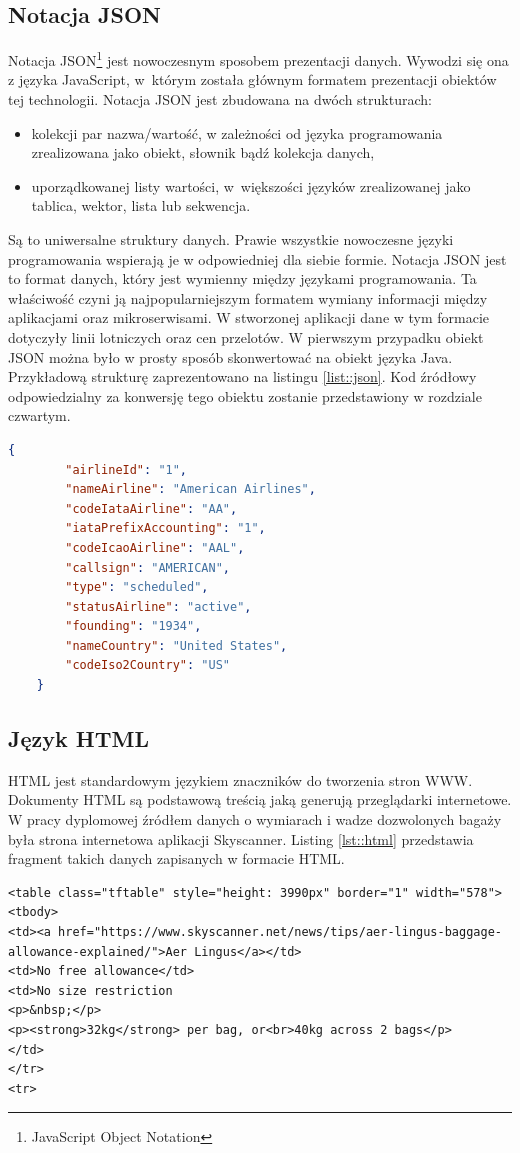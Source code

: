 \documentclass[12pt, twoside]{report}
\begin{document}
\subsection{Notacja JSON}
Notacja JSON\footnote{JavaScript Object Notation} jest nowoczesnym sposobem prezentacji danych. Wywodzi się ona z języka JavaScript, w~którym została głównym formatem prezentacji obiektów tej technologii. Notacja JSON jest zbudowana na dwóch strukturach:
\begin{itemize}[noitemsep,topsep=0pt]
\item kolekcji par nazwa/wartość, w zależności od języka programowania zrealizowana jako obiekt, słownik bądź kolekcja danych,
\item uporządkowanej listy wartości, w~większości języków zrealizowanej jako tablica, wektor, lista lub sekwencja.
\end{itemize}
Są to uniwersalne struktury danych. Prawie wszystkie nowoczesne języki programowania wspierają je w odpowiedniej dla siebie formie. Notacja JSON jest to format danych, który jest wymienny między językami programowania. Ta właściwość czyni ją najpopularniejszym formatem wymiany informacji między aplikacjami oraz mikroserwisami\cite{json}. W stworzonej aplikacji dane w tym formacie dotyczyły linii lotniczych oraz cen przelotów. W pierwszym przypadku obiekt JSON można było w prosty sposób skonwertować na obiekt języka Java. Przykładową strukturę zaprezentowano na listingu \ref{list::json}.
Kod źródłowy odpowiedzialny za konwersję tego obiektu zostanie przedstawiony w rozdziale czwartym.
\begin{lstlisting}[language=JSON, caption= Przykładowy obiekt w notacji JSON, label=list::json]
    {
        "airlineId": "1",
        "nameAirline": "American Airlines",
        "codeIataAirline": "AA",
        "iataPrefixAccounting": "1",
        "codeIcaoAirline": "AAL",
        "callsign": "AMERICAN",
        "type": "scheduled",
        "statusAirline": "active",
        "founding": "1934",
        "nameCountry": "United States",
        "codeIso2Country": "US"
    }
\end{lstlisting}

\subsection{Język HTML}
HTML jest standardowym językiem znaczników do tworzenia stron WWW. Dokumenty HTML są podstawową treścią jaką generują przeglądarki internetowe. W pracy dyplomowej źródłem danych o wymiarach i wadze dozwolonych bagaży była strona internetowa aplikacji Skyscanner\cite{html}. Listing \ref{lst::html} przedstawia fragment takich danych zapisanych w formacie HTML.
\begin{lstlisting}[language=HTML5, caption= Fragment dokumentu HTML, label=lst::html]
<table class="tftable" style="height: 3990px" border="1" width="578">
<tbody>
<td><a href="https://www.skyscanner.net/news/tips/aer-lingus-baggage-allowance-explained/">Aer Lingus</a></td>
<td>No free allowance</td>
<td>No size restriction
<p>&nbsp;</p>
<p><strong>32kg</strong> per bag, or<br>40kg across 2 bags</p>
</td>
</tr>
<tr>
\end{lstlisting}
\end{document}
